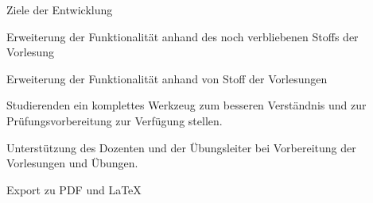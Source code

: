 {
  \begin{itemgroup}{Ziele der Entwicklung}
    \item Erweiterung der Funktionalität anhand des noch verbliebenen
        Stoffs der Vorlesung \glqq\TPONE \grqq
    \item Erweiterung der Funktionalität anhand von Stoff der 
        Vorlesungen \glqq\TPTWO \grqq
    \item Studierenden ein komplettes Werkzeug zum besseren Verständnis und zur 
        Prüfungsvorbereitung zur Verfügung stellen.
    \item Unterstützung des Dozenten und der Übungsleiter bei Vorbereitung 
        der Vorlesungen und Übungen.
	\item Export zu PDF und \LaTeX
  \end{itemgroup}
}



